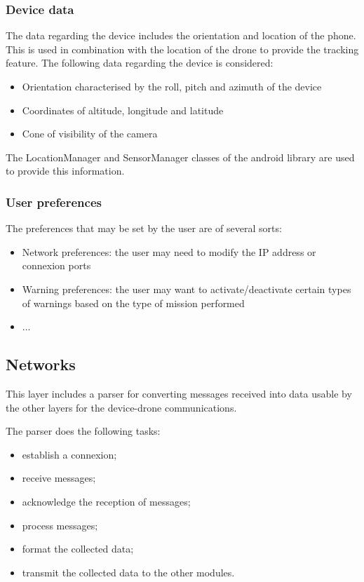\documentclass[conference]{IEEEtran}
\begin{document}
\subsubsection{Device data}
The data regarding the device includes the orientation and location of the phone. This is used in combination with the location of the drone to provide the tracking feature. The following data regarding the device is considered:
\begin{itemize}
\item Orientation characterised by the roll, pitch and azimuth of the device
\item Coordinates of altitude, longitude and latitude
\item Cone of visibility of the camera
\end{itemize}

The LocationManager and SensorManager classes of the android library are used to provide this information.

\subsubsection{User preferences}
The preferences that may be set by the user are of several sorts:
\begin{itemize}
\item Network preferences: the user may need to modify the IP address or connexion ports
\item Warning preferences: the user may want to activate/deactivate certain types of warnings based on the type of mission performed
\item ...
\end{itemize}

\subsection{Networks}
This layer includes a parser for converting messages received into data usable by the other layers for the device-drone communications.

The parser does the following tasks:
\begin{itemize}
\item establish a connexion;
\item receive messages;
\item acknowledge the reception of messages;
\item process messages;
\item format the collected data;
\item transmit the collected data to the other modules.
\end{itemize}
\end{document}
